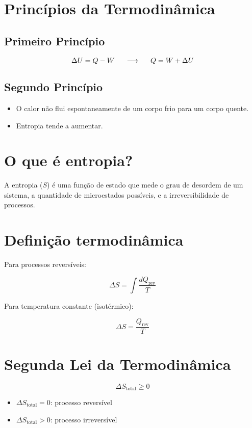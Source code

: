 \documentclass[a4paper,12pt]{article}
\begin{document}
\begin{multicols}{2}
\section{Princ\'ipios da Termodinâmica}

\subsection{Primeiro Princípio}
\begin{equation*}
    \Delta U = Q - W   \hspace{0.5cm} \longrightarrow \hspace{0.5cm} Q = W + \Delta U
\end{equation*}
\subsection{Segundo Princípio}
\begin{itemize}
    \item O calor não flui espontaneamente de um corpo frio para um corpo quente.
    \item Entropia tende a aumentar.
\end{itemize}

\section*{O que é entropia?}
A entropia (\(S\)) é uma função de estado que mede o grau de desordem de um sistema, a quantidade de microestados possíveis, e a irreversibilidade de processos.

\section*{Definição termodinâmica}
Para processos reversíveis:

\[
\Delta S = \int \frac{dQ_{\text{rev}}}{T}
\]

Para temperatura constante (isotérmico):

\[
\Delta S = \frac{Q_{\text{rev}}}{T}
\]

\section*{Segunda Lei da Termodinâmica}

\[
\Delta S_{\text{total}} \geq 0
\]

\begin{itemize}
  \item \( \Delta S_{\text{total}} = 0 \): processo reversível
  \item \( \Delta S_{\text{total}} > 0 \): processo irreversível
\end{itemize}


\end{multicols}
\end{document}
